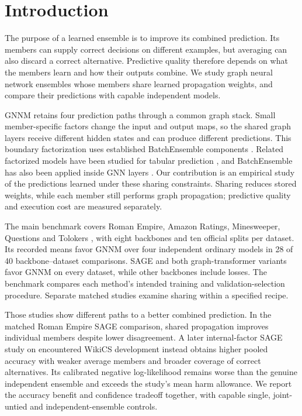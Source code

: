 \section{Introduction}
The purpose of a learned ensemble is to improve its combined prediction. Its members can supply correct decisions on different examples, but averaging can also discard a correct alternative. Predictive quality therefore depends on what the members learn and how their outputs combine. We study graph neural network ensembles whose members share learned propagation weights, and compare their predictions with capable independent models.

GNNM retains four prediction paths through a common graph stack. Small member-specific factors change the input and output maps, so the shared graph layers receive different hidden states and can produce different predictions. This boundary factorization uses established BatchEnsemble components \citep{wen2020batchensemble}. Related factorized models have been studied for tabular prediction \citep{gorishniy2025tabm}, and BatchEnsemble has also been applied inside GNN layers \citep{kim2023efficient}. Our contribution is an empirical study of the predictions learned under these sharing constraints. Sharing reduces stored weights, while each member still performs graph propagation; predictive quality and execution cost are measured separately.

The main benchmark covers Roman Empire, Amazon Ratings, Minesweeper, Questions and Tolokers \citep{platonov2023critical}, with eight backbones and ten official splits per dataset. Its recorded means favor GNNM over four independent ordinary models in 28 of 40 backbone--dataset comparisons. SAGE and both graph-transformer variants favor GNNM on every dataset, while other backbones include losses. The benchmark compares each method's intended training and validation-selection procedure. Separate matched studies examine sharing within a specified recipe.

Those studies show different paths to a better combined prediction. In the matched Roman Empire SAGE comparison, shared propagation improves individual members despite lower disagreement. A later internal-factor SAGE study on encountered WikiCS development instead obtains higher pooled accuracy with weaker average members and broader coverage of correct alternatives. Its calibrated negative log-likelihood remains worse than the genuine independent ensemble and exceeds the study's mean harm allowance. We report the accuracy benefit and confidence tradeoff together, with capable single, joint-untied and independent-ensemble controls.

